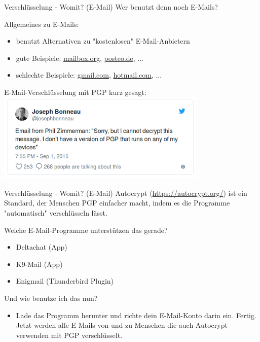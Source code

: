 \documentclass{beamer}
\begin{document}
\begin{frame}{Verschlüsselung - Womit? (E-Mail)}
	Wer benutzt denn noch E-Mails? \\\pause
	\hspace{1cm}
	
	Allgemeines zu E-Mails:
	\begin{itemize}
		\item benutzt Alternativen zu "kostenlosen" E-Mail-Anbietern
		\item gute Beispiele: \url{mailbox.org}, \url{posteo.de}, ...
		\item schlechte Beispiele: \url{gmail.com}, \url{hotmail.com}, ...
	\end{itemize}
	\hspace{1cm}\pause
	
	E-Mail-Verschlüsselung mit PGP kurz gesagt:\\
	\includegraphics[width=10cm]{phil.png}
\end{frame}

\begin{frame}{Verschlüsselung - Womit? (E-Mail)}
	Autocrypt (\url{https://autocrypt.org/}) ist ein Standard, der Menschen PGP einfacher macht, indem es die Programme "automatisch" verschlüsseln  lässt.\\
	\hspace{1cm}
	
	Welche E-Mail-Programme unterstützen das gerade?
	\begin{itemize}
	\item Deltachat (App)
	\item K9-Mail (App)
	\item Enigmail (Thunderbird Plugin)
	\end{itemize}
	\hspace{1cm}
	
	Und wie benutze ich das nun?
	\begin{itemize}
		\item Lade das Programm herunter und richte dein E-Mail-Konto darin ein. Fertig. Jetzt werden alle E-Mails von und zu Menschen die auch Autocrypt verwenden mit PGP verschlüsselt.
	\end{itemize}
\end{frame}
\end{document}
